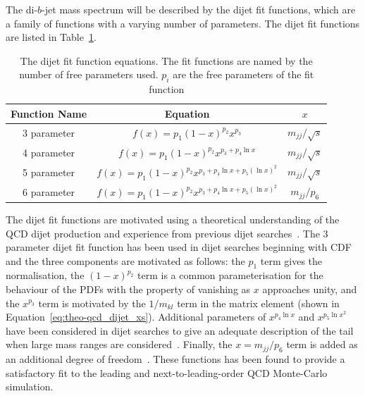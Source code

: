 

The di-$b$-jet mass spectrum will be described by the dijet fit functions,
which are a family of functions with a varying number of parameters.
The dijet fit functions are listed in Table~\ref{tab:bkg-fit}.

{\renewcommand{\arraystretch}{1.2}
\begin{table}[!thb]
\centering
\begin{tabular}{|c||c|c|}
  \hline
  Function Name & Equation                                          & $x$ \\
  \hline
  3 parameter   & $f(x)=p_1(1-x)^{p_2}x^{p_3}$                         & $m_{jj}/\sqrt{s}$ \\
  4 parameter   & $f(x)=p_1(1-x)^{p_2}x^{p_3+p_4\ln{x}}$                &$m_{jj}/\sqrt{s}$\\
  5 parameter   & $f(x)=p_1(1-x)^{p_2}x^{p_3+p_4\ln{x}+p_5(\ln{x})^{2}}$   & $m_{jj}/\sqrt{s}$\\ 
  6 parameter   & $f(x)=p_1(1-x)^{p_2}x^{p_3+p_4\ln{x}+p_5(\ln{x})^{2}}$   &  $m_{jj}/p_6$\\ 
  \hline
\end{tabular}
\caption{The dijet fit function equations. The fit functions are named by the number of free parameters used. $p_{i}$ are the free parameters of the fit function}
\label{tab:bkg-fit}
\end{table}}

The dijet fit functions are motivated using a theoretical understanding of the QCD dijet production
and experience from previous dijet searches~\cite{theo-dijet_harris}.
The 3 parameter dijet fit function has been used in dijet searches beginning with CDF~\cite{dijet-CDF_3par}
and the three components are motivated as follows:
the $p_1$ term gives the normalisation,
the $(1-x)^{p_2}$ term is a common parameterisation for the behaviour of the PDFs with the property of vanishing as $x$ approaches unity,
and the $x^{p_3}$ term is motivated by the $1/m_{kl}$ term in the matrix element (shown in Equation~\ref{eq:theo-qcd_dijet_xs}).
Additional parameters of $x^{p_4\ln{x}}$ and $x^{p_5\ln{x}^{2}}$ have been considered in dijet searches to give an adequate description of the tail
when large mass ranges are considered~\cite{dijet-CDF_4par,dijet-mori16_int}.
Finally, the $x=m_{jj}/p_6$ term is added as an additional degree of freedom~\cite{det-thesis_kate}.
These functions has been found to provide a satisfactory fit to the leading and next-to-leading-order QCD Monte-Carlo simulation.


